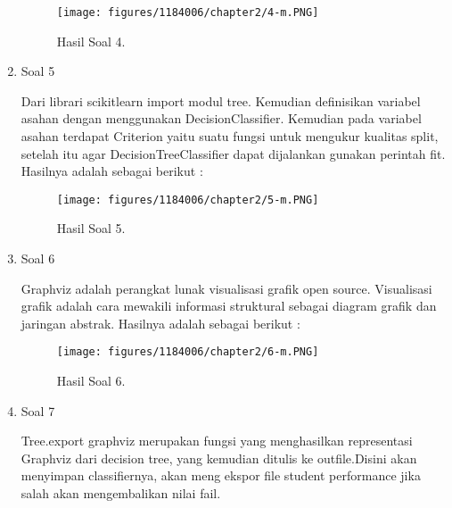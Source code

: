 \begin{enumerate}
	\begin{figure}[h]
	\centering
		\texttt{[image: figures/1184006/chapter2/4-m.PNG]}
		\caption{Hasil Soal 4.}
	\end{figure}
	\item Soal 5
	\hfill\break
	
	Dari librari scikitlearn import modul tree. Kemudian definisikan variabel asahan dengan menggunakan DecisionClassifier. Kemudian pada variabel asahan terdapat Criterion yaitu suatu fungsi untuk mengukur kualitas split, setelah itu agar DecisionTreeClassifier dapat dijalankan gunakan perintah fit. Hasilnya adalah sebagai berikut :
	\begin{figure}[h]
	\centering
		\texttt{[image: figures/1184006/chapter2/5-m.PNG]}
		\caption{Hasil Soal 5.}
	\end{figure}
\item Soal 6
	\hfill\break
	
	Graphviz adalah perangkat lunak visualisasi grafik open source. Visualisasi grafik adalah cara mewakili informasi struktural sebagai diagram grafik dan jaringan abstrak. Hasilnya adalah sebagai berikut :
	\begin{figure}[h]
	\centering
		\texttt{[image: figures/1184006/chapter2/6-m.PNG]}
		\caption{Hasil Soal 6.}
	\end{figure}
	\item Soal 7
	\hfill\break
	
	Tree.export graphviz merupakan fungsi yang menghasilkan representasi Graphviz dari decision tree, yang kemudian ditulis ke outfile.Disini akan menyimpan classifiernya, akan meng ekspor file student performance jika salah akan mengembalikan nilai fail. 


\end{enumerate}
